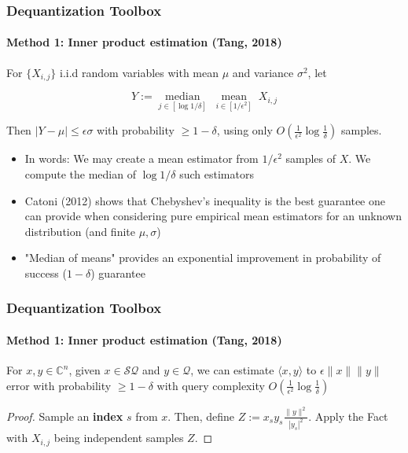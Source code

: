 \documentclass{beamer}
\newcommand\0{\mathbf{0}}
\newcommand\CC{\mathbb{C}}
\newcommand\<{\langle}
\renewcommand\>{\rangle}
\begin{document}
\begin{frame}
\frametitle{Dequantization Toolbox}
\framesubtitle{Method 1: Inner product estimation (Tang, 2018)}
\begin{fact} For $\{X_{i,j}\}$ i.i.d random variables with mean $\mu$ and variance $\sigma^2$, let 

$$Y := \underset{j \in [\log 1/\delta]}{\operatorname{median}}\;\underset{i \in [1/\epsilon^2]}{\operatorname{mean}}\;X_{i,j}$$

Then $\vert Y - \mu\vert \leq \epsilon\sigma$ with probability $\geq 1-\delta$, using only $O(\frac{1}{\epsilon^2}\log\frac{1}{\delta})$ samples.
\end{fact}

\begin{itemize}
	\item In words: We may create a mean estimator from $1/\epsilon^2$ samples of $X$. We compute the median of $\log 1/\delta$ such estimators
	\pause
	\item Catoni (2012) shows that Chebyshev's inequality is the best guarantee one can provide when considering pure empirical mean estimators for an unknown distribution (and finite $\mu, \sigma$)
	\item "Median of means" provides an exponential improvement in probability of success ($1 - \delta$) guarantee
\end{itemize}
\end{frame}

\begin{frame}
\frametitle{Dequantization Toolbox}
\framesubtitle{Method 1: Inner product estimation (Tang, 2018)}
\begin{corollary} For $x,y \in\CC^n$, given $x \in \mathcal{SQ}$ and $y \in \mathcal{Q}$, we can estimate $\langle x,y\rangle$ to $\epsilon\|x\|\|y\|$ error with probability $\geq 1-\delta$ with query complexity $O(\frac{1}{\epsilon^2}\log\frac{1}{\delta})$
\end{corollary}
\pause
\begin{proof}Sample an \textbf{index} $s$ from $x$. Then, define $Z := x_s y_s\frac{\|y\|^2}{|y_s|^2}$. Apply the Fact with $X_{i,j}$ being independent samples $Z$.
\end{proof}	
\end{frame}
\end{document}
